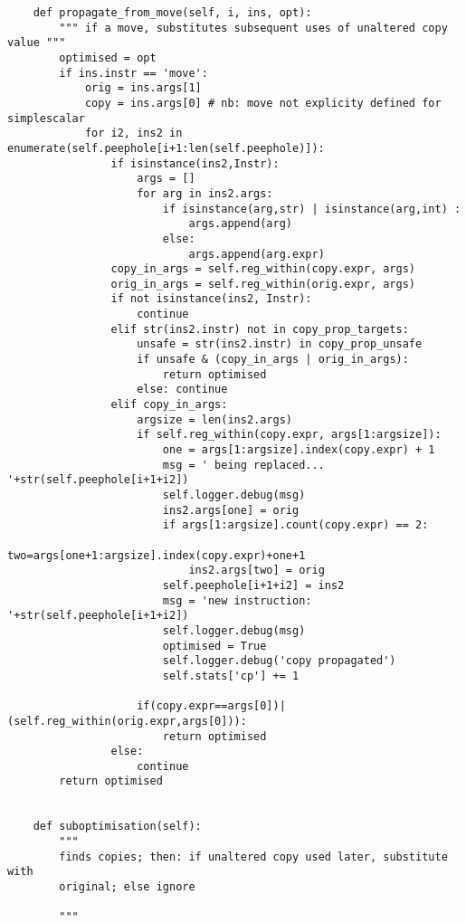 \begin{lstlisting}
    def propagate_from_move(self, i, ins, opt):
        """ if a move, substitutes subsequent uses of unaltered copy value """
        optimised = opt
        if ins.instr == 'move': 
            orig = ins.args[1]
            copy = ins.args[0] # nb: move not explicity defined for simplescalar
            for i2, ins2 in enumerate(self.peephole[i+1:len(self.peephole)]):
                if isinstance(ins2,Instr):
                    args = []
                    for arg in ins2.args:
                        if isinstance(arg,str) | isinstance(arg,int) :
                            args.append(arg)
                        else:
                            args.append(arg.expr)
                copy_in_args = self.reg_within(copy.expr, args)
                orig_in_args = self.reg_within(orig.expr, args)
                if not isinstance(ins2, Instr):
                    continue
                elif str(ins2.instr) not in copy_prop_targets:
                    unsafe = str(ins2.instr) in copy_prop_unsafe
                    if unsafe & (copy_in_args | orig_in_args):
                        return optimised
                    else: continue
                elif copy_in_args:
                    argsize = len(ins2.args)
                    if self.reg_within(copy.expr, args[1:argsize]):
                        one = args[1:argsize].index(copy.expr) + 1
                        msg = ' being replaced... '+str(self.peephole[i+1+i2])
                        self.logger.debug(msg)
                        ins2.args[one] = orig
                        if args[1:argsize].count(copy.expr) == 2:
                            two=args[one+1:argsize].index(copy.expr)+one+1
                            ins2.args[two] = orig
                        self.peephole[i+1+i2] = ins2
                        msg = 'new instruction: '+str(self.peephole[i+1+i2])
                        self.logger.debug(msg)
                        optimised = True
                        self.logger.debug('copy propagated')
                        self.stats['cp'] += 1

                    if(copy.expr==args[0])|(self.reg_within(orig.expr,args[0])):
                        return optimised
                else:
                    continue
        return optimised
                            

    def suboptimisation(self):
        """ 
        finds copies; then: if unaltered copy used later, substitute with
        original; else ignore
        
        """


\end{lstlisting}
